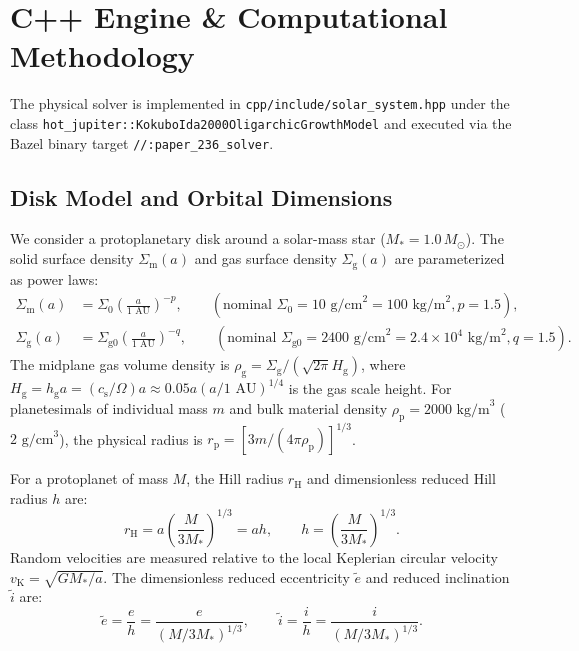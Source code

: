 \documentclass[11pt,a4paper]{article}
\begin{document}
\section{C++ Engine \& Computational Methodology}
The physical solver is implemented in \texttt{cpp/include/solar\_system.hpp} under the class \linebreak \texttt{hot\_jupiter::KokuboIda2000OligarchicGrowthModel} and executed via the Bazel binary target \linebreak \texttt{//:paper\_236\_solver}.

\subsection{Disk Model and Orbital Dimensions}
We consider a protoplanetary disk around a solar-mass star ($M_* = 1.0\,M_\odot$). The solid surface density $\Sigma_{\text{m}}(a)$ and gas surface density $\Sigma_{\text{g}}(a)$ are parameterized as power laws:
\begin{align}
\Sigma_{\text{m}}(a) &= \Sigma_0 \left( \frac{a}{1\text{ AU}} \right)^{-p}, \qquad (\text{nominal }\Sigma_0 = 10\text{ g/cm}^2 = 100\text{ kg/m}^2, p = 1.5), \\
\Sigma_{\text{g}}(a) &= \Sigma_{\text{g}0} \left( \frac{a}{1\text{ AU}} \right)^{-q}, \qquad (\text{nominal }\Sigma_{\text{g}0} = 2400\text{ g/cm}^2 = 2.4\times 10^4\text{ kg/m}^2, q = 1.5).
\end{align}
The midplane gas volume density is $\rho_{\text{g}} = \Sigma_{\text{g}} / (\sqrt{2\pi} H_{\text{g}})$, where $H_{\text{g}} = h_{\text{g}} a = (c_{\text{s}} / \Omega) a \approx 0.05 a (a / 1\text{ AU})^{1/4}$ is the gas scale height. For planetesimals of individual mass $m$ and bulk material density $\rho_{\text{p}} = 2000\text{ kg/m}^3$ ($2\text{ g/cm}^3$), the physical radius is $r_{\text{p}} = [3m / (4\pi \rho_{\text{p}})]^{1/3}$.

For a protoplanet of mass $M$, the Hill radius $r_{\text{H}}$ and dimensionless reduced Hill radius $h$ are:
\begin{equation}
r_{\text{H}} = a \left( \frac{M}{3 M_*} \right)^{1/3} = a h, \qquad h = \left( \frac{M}{3 M_*} \right)^{1/3}.
\end{equation}
Random velocities are measured relative to the local Keplerian circular velocity $v_{\text{K}} = \sqrt{G M_* / a}$. The dimensionless reduced eccentricity $\tilde{e}$ and reduced inclination $\tilde{i}$ are:
\begin{equation}
\tilde{e} = \frac{e}{h} = \frac{e}{(M / 3M_*)^{1/3}}, \qquad \tilde{i} = \frac{i}{h} = \frac{i}{(M / 3M_*)^{1/3}}.
\end{equation}
\end{document}
